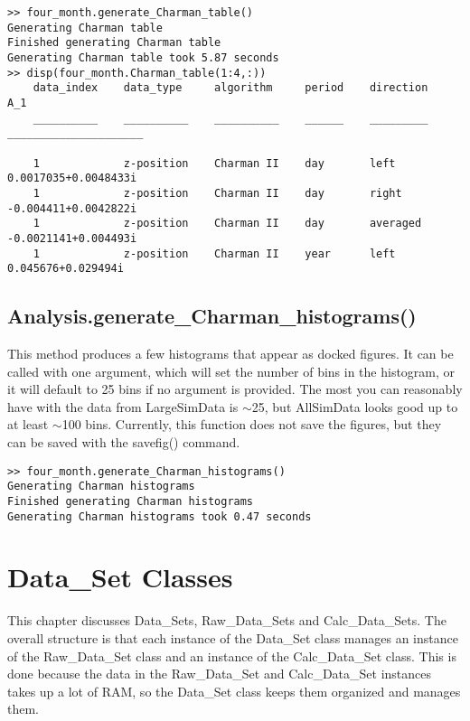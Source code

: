 \documentclass[12pt]{report}
\begin{document}
\begin{verbatim}
>> four_month.generate_Charman_table()
Generating Charman table
Finished generating Charman table
Generating Charman table took 5.87 seconds
>> disp(four_month.Charman_table(1:4,:))
    data_index    data_type     algorithm     period    direction             A_1         
    __________    __________    __________    ______    _________    _____________________

    1             z-position    Charman II    day       left          0.0017035+0.0048433i
    1             z-position    Charman II    day       right         -0.004411+0.0042822i
    1             z-position    Charman II    day       averaged     -0.0021141+0.004493i 
    1             z-position    Charman II    year      left           0.045676+0.029494i 
\end{verbatim}

\section{Analysis.generate\_Charman\_histograms()}
This method produces a few histograms that appear as docked figures.  It can be called with one argument, which will set the number of bins in the histogram, or it will default to 25 bins if no argument is provided.  The most you can reasonably have with the data from LargeSimData is ${\sim}$25, but AllSimData looks good up to at least ${\sim}$100 bins.  Currently, this function does not save the figures, but they can be saved with the savefig() command.

\begin{verbatim}
>> four_month.generate_Charman_histograms()
Generating Charman histograms
Finished generating Charman histograms
Generating Charman histograms took 0.47 seconds
\end{verbatim}





\chapter{Data\_Set Classes}
\label{chap:data_set}
This chapter discusses Data\_Sets, Raw\_Data\_Sets and Calc\_Data\_Sets.  The overall structure is that each instance of the Data\_Set class manages an instance of the Raw\_Data\_Set class and an instance of the Calc\_Data\_Set class.  This is done because the data in the Raw\_Data\_Set and Calc\_Data\_Set instances takes up a lot of RAM, so the Data\_Set class keeps them organized and manages them.
\end{document}
